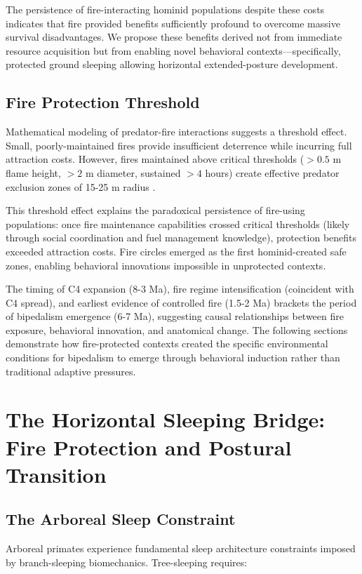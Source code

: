\documentclass[12pt,a4paper]{article}
\begin{document}
The persistence of fire-interacting hominid populations despite these costs indicates that fire provided benefits sufficiently profound to overcome massive survival disadvantages. We propose these benefits derived not from immediate resource acquisition but from enabling novel behavioral contexts—specifically, protected ground sleeping allowing horizontal extended-posture development.

\subsection{Fire Protection Threshold}

Mathematical modeling of predator-fire interactions suggests a threshold effect. Small, poorly-maintained fires provide insufficient deterrence while incurring full attraction costs. However, fires maintained above critical thresholds ($>0.5$ m flame height, $>2$ m diameter, sustained $>4$ hours) create effective predator exclusion zones of 15-25 m radius \citep{gowlett2016earliest}.

This threshold effect explains the paradoxical persistence of fire-using populations: once fire maintenance capabilities crossed critical thresholds (likely through social coordination and fuel management knowledge), protection benefits exceeded attraction costs. Fire circles emerged as the first hominid-created safe zones, enabling behavioral innovations impossible in unprotected contexts.

The timing of C4 expansion (8-3 Ma), fire regime intensification (coincident with C4 spread), and earliest evidence of controlled fire (1.5-2 Ma) brackets the period of bipedalism emergence (6-7 Ma), suggesting causal relationships between fire exposure, behavioral innovation, and anatomical change. The following sections demonstrate how fire-protected contexts created the specific environmental conditions for bipedalism to emerge through behavioral induction rather than traditional adaptive pressures.

\section{The Horizontal Sleeping Bridge: Fire Protection and Postural Transition}
\subsection{The Arboreal Sleep Constraint}

Arboreal primates experience fundamental sleep architecture constraints imposed by branch-sleeping biomechanics. Tree-sleeping requires:
\end{document}
